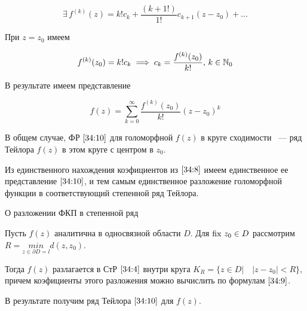 \documentclass[../../main.tex]{subfiles}
\begin{document}
\[ \exists\, f^{(k)}(z) = k!c_k + \frac{(k + 1!)}{1!}c_{k + 1}(z - z_0) + 
\ldots \]

При $ z = z_0 $ имеем

\begin{equation}\label{34:9}
	f^{(k)}(z_0) = k!c_k \implies c_k = \frac{f^{(k)}(z_0)}{k!},\, k \in \mathbb{N}_0
\end{equation}

В результате имеем представление

\begin{equation}\label{34:10}
	f(z) = \sum\limits_{k = 0}^{\infty} \frac{f^{(k)}(z_0)}{k!}(z - z_0)^k
\end{equation}

В общем случае, ФР $ \eqref{34:10} $ для голоморфной $ f(z) $ в круге 
сходимости ~--- ряд Тейлора $ f(z) $ в этом круге с центром в $ z_0 $.

Из единственного нахождения коэфициентов из $ \eqref{34:8} $ имеем 
единственное ее представление $ \eqref{34:10} $, и тем самым единственное 
разложение голоморфной функции в соответствующий степенной ряд Тейлора.

\begin{thm}{О разложении ФКП в степенной ряд}
	\;
	
	Пусть $ f(z) $ аналитична в односвязной области $ D $. Для $ \operatorname{fix}\, z_0 \in D 
	$ рассмотрим $ R = \underset{z \in \partial D = l}{min}d(z, z_0) $.
	
	Тогда $ f(z) $ разлагается в СтР $ \eqref{34:4} $ внутри круга $ K_R = \{z 
	\in D | \quad |z - z_0| < R \} $, причем коэфициенты этого разложения можно 
	вычислить по формулам $ \eqref{34:9} $.
	
	В результате получим ряд Тейлора $ \eqref{34:10} $ для $f(z)$.
\end{thm}
\end{document}
